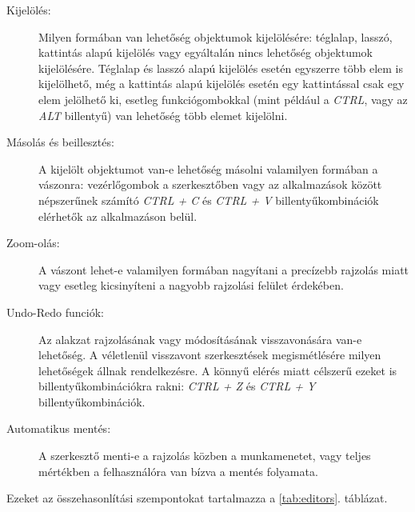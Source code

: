 \begin{description}
	\item[Kijelölés:] Milyen formában van lehetőség objektumok kijelölésére: téglalap, lasszó, kattintás alapú kijelölés vagy egyáltalán nincs lehetőség objektumok kijelölésére. Téglalap és lasszó alapú kijelölés esetén egyszerre több elem is kijelölhető, még a kattintás alapú kijelölés esetén egy kattintással csak egy elem jelölhető ki, esetleg funkciógombokkal (mint például a \textit{CTRL}, vagy az \textit{ALT} billentyű) van lehetőség több elemet kijelölni.
	\item[Másolás és beillesztés:] A kijelölt objektumot van-e lehetőség másolni valamilyen formában a vászonra: vezérlőgombok a szerkesztőben vagy az alkalmazások között népszerűnek számító \textit{CTRL + C} és \textit{CTRL + V} billentyűkombinációk elérhetők az alkalmazáson belül.
	\item[Zoom-olás:] A vászont lehet-e valamilyen formában nagyítani a precízebb rajzolás miatt vagy esetleg kicsinyíteni a nagyobb rajzolási felület érdekében. 
	\item[Undo-Redo funciók:] Az alakzat rajzolásának vagy módosításának visszavonására van-e lehetőség. A véletlenül visszavont szerkesztések megismétlésére milyen lehetőségek állnak rendelkezésre. A könnyű elérés miatt célszerű ezeket is billentyűkombinációkra rakni: \textit{CTRL + Z} és \textit{CTRL + Y} billentyűkombinációk.
	\item[Automatikus mentés:] A szerkesztő menti-e a rajzolás közben a munkamenetet, vagy teljes mértékben a felhasználóra van bízva a mentés folyamata.
\end{description}

\noindent
Ezeket az összehasonlítási szempontokat tartalmazza a \ref{tab:editors}. táblázat.

